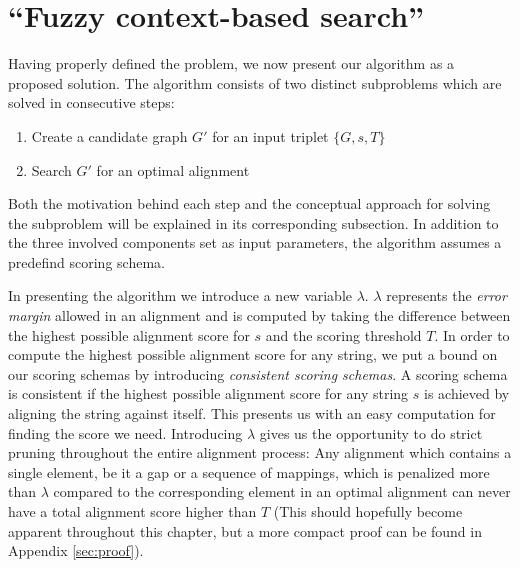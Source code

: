 \documentclass[thesis.tex]{subfiles}
\begin{document}
\section{``Fuzzy context-based search''}
Having properly defined the problem, we now present our algorithm as a proposed solution. The algorithm consists of two distinct subproblems which are solved in consecutive steps:
\begin{enumerate}
  \item Create a candidate graph $G'$ for an input triplet $\{G, s, T\}$
  \item Search $G'$ for an optimal alignment
\end{enumerate}
Both the motivation behind each step and the conceptual approach for solving the subproblem will be explained in its corresponding subsection. In addition to the three involved components set as input parameters, the algorithm assumes a predefind scoring schema.\\
\par\noindent
In presenting the algorithm we introduce a new variable $\lambda$. $\lambda$ represents the \textit{error margin} allowed in an alignment and is computed by taking the difference between the highest possible alignment score for $s$ and the scoring threshold $T$. In order to compute the highest possible alignment score for any string, we put a bound on our scoring schemas by introducing \textit{consistent scoring schemas}. A scoring schema is consistent if the highest possible alignment score for any string $s$ is achieved by aligning the string against itself. This presents us with an easy computation for finding the score we need. Introducing $\lambda$ gives us the opportunity to do strict pruning throughout the entire alignment process: Any alignment which contains a single element, be it a gap or a sequence of mappings, which is penalized more than $\lambda$ compared to the corresponding element in an optimal alignment can never have a total alignment score higher than $T$ (This should hopefully become apparent throughout this chapter, but a more compact proof can be found in Appendix \ref{sec:proof}).
\end{document}
